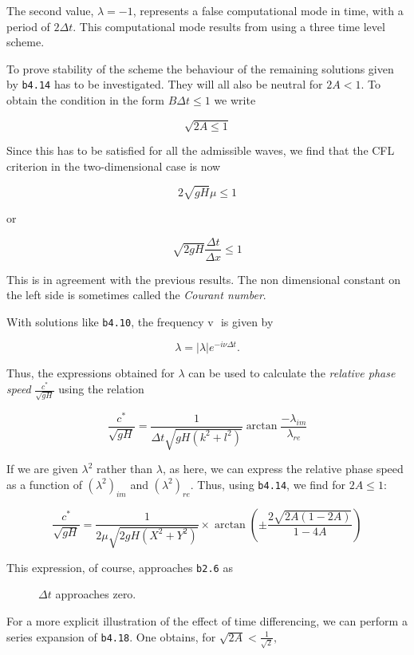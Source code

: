 The second value, \(\lambda = - 1\), represents a false computational
mode in time, with a period of \(2\Delta t\). This computational mode
results from using a three time level scheme.

To prove stability of the scheme the behaviour of the remaining
solutions given by \texttt{b4.14} has to be investigated. They will all
also be neutral for \(2A < 1\). To obtain the condition in the form
\(B\Delta t \leq 1\) we write

\[\sqrt{2A \leq 1}\]

Since this has to be satisfied for all the admissible waves, we find
that the CFL criterion in the two-dimensional case is now

\[2\sqrt{gH}\mu \leq 1\]

or

\[\sqrt{2gH}\frac{\Delta t}{\Delta x} \leq 1\]

This is in agreement with the previous results. The non dimensional
constant on the left side is sometimes called the \emph{Courant number}.

With solutions like \texttt{b4.10}, the frequency \(\text{v }\) is given
by

\[\lambda = \left| \lambda \right|e^{- i\nu\Delta t}.\]

Thus, the expressions obtained for \(\lambda\) can be used to calculate
the \emph{relative phase speed} \(\frac{c^{*}}{\sqrt{gH}}\) using the
relation

\[\frac{c^{*}}{\sqrt{gH}} = \frac{1}{\Delta t\sqrt{gH\left( k^{2} + l^{2} \right)}}\arctan\frac{- \lambda_{im}}{\lambda_{re}}\]

If we are given \(\lambda^{2}\) rather than \(\lambda\), as here, we can
express the relative phase speed as a function of \((\lambda^{2})_{im}\)
and \((\lambda^{2})_{re}\). Thus, using \texttt{b4.14}, we find for
\(2A \leq 1:\)

\[\frac{c^*}{\sqrt{gH}} = \frac{1}{2\mu\sqrt{2gH\left( X^{2} + Y^{2} \right)}} \times
 \arctan{ \left( \pm \frac{2\sqrt{2A\left( 1 - 2A \right)}}{1 - 4A} \right)   }\]

\begin{description}
\item[This expression, of course, approaches \texttt{b2.6} as]
\(\Delta t\) approaches zero.
\end{description}

For a more explicit illustration of the effect of time differencing, we
can perform a series expansion of \texttt{b4.18}. One obtains, for
\(\sqrt{2A} < \frac{1}{\sqrt{2}},\)

